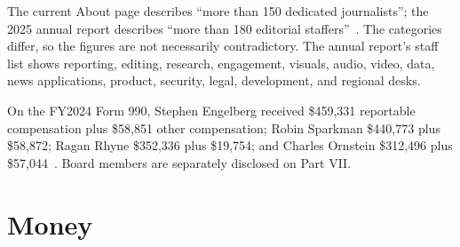 \documentclass[10pt,letterpaper,twocolumn]{article}
\begin{document}
The current About page describes ``more than 150 dedicated journalists''; the 2025 annual report describes ``more than 180 editorial staffers''~\citep{ppabout,pp2025}. The categories differ, so the figures are not necessarily contradictory. The annual report's staff list shows reporting, editing, research, engagement, visuals, audio, video, data, news applications, product, security, legal, development, and regional desks.

On the FY2024 Form 990, Stephen Engelberg received \$459,331 reportable compensation plus \$58,851 other compensation; Robin Sparkman \$440,773 plus \$58,872; Ragan Rhyne \$352,336 plus \$19,754; and Charles Ornstein \$312,496 plus \$57,044~\citep{pp990}. Board members are separately disclosed on Part VII.

\section{Money}
\end{document}
